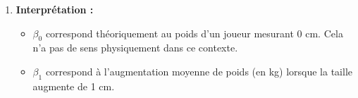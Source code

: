 \documentclass[solutions]{../exercices}
\begin{document}
\begin{solution}
\begin{enumerate}
        Calculons d'abord l'inverse de la matrice :
        \[
            (\tilde{X}^T \tilde{X})^{-1} = \frac{1}{736} \begin{bmatrix}
                132680 & -728 \\
                -728 & 4
            \end{bmatrix}
        \]
        Calculons ensuite le vecteur $\tilde{X}^T Y$ :
        \[
            \tilde{X}^T Y = \begin{bmatrix}
                1 & 1 & 1 & 1 \\
                190 & 172 & 186 & 180
            \end{bmatrix}
            \begin{bmatrix}
                112 \\ 85 \\ 135 \\ 92
            \end{bmatrix}
            = \begin{bmatrix}
                424 \\
                77570
            \end{bmatrix}
        \]
        Enfin, nous obtenons $\hat{\beta}$ :
        \[
            \hat{\beta} = \frac{1}{736} \begin{bmatrix}
                132680 & -728 \\
                -728 & 4
            \end{bmatrix}
            \begin{bmatrix}
                424 \\
                77570
            \end{bmatrix}
            = \frac{1}{736} \begin{bmatrix}
                -214640 \\
                1608
            \end{bmatrix}
            \approx \begin{bmatrix}
                -291.63 \\
                2.185
            \end{bmatrix}
        \]
        D'où $\beta_0 \approx -291.63$ et $\beta_1 \approx 2.185$.

        \item \textbf{Interprétation :}
        \begin{itemize}
            \item $\beta_0$ correspond théoriquement au poids d'un joueur mesurant 0 cm. Cela n'a pas de sens physiquement dans ce contexte.
            \item $\beta_1$ correspond à l'augmentation moyenne de poids (en kg) lorsque la taille augmente de 1 cm.
        \end{itemize}


\end{enumerate}
\end{solution}
\end{document}
